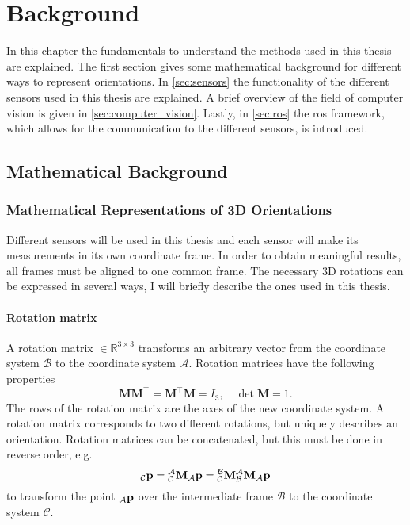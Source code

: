 \chapter{Background}
\label{ch:Background}
In this chapter the fundamentals to understand the methods used in this thesis are explained.
The first section gives some mathematical background for different ways to represent orientations.
In \cref{sec:sensors} the functionality of the different sensors used in this thesis are explained.
A brief overview of the field of computer vision is given in \cref{sec:computer_vision}.
Lastly, in \cref{sec:ros} the \gls{ros} framework, which allows for the communication to the different sensors, is introduced.


\section{Mathematical Background}
\subsection{Mathematical Representations of 3D Orientations}
Different sensors will be used in this thesis and each sensor will make its measurements in its own coordinate frame.
In order to obtain meaningful results, all frames must be aligned to one common frame.
The necessary 3D rotations can be expressed in several ways, I will briefly describe the ones used in this thesis.

\subsubsection{Rotation matrix}
A rotation matrix  $\in \mathbb{R}^{3\times3}$ transforms an arbitrary vector from the coordinate system $\mathcal{B}$ to the coordinate system $\mathcal{A}$.
Rotation matrices have the following properties
\begin{equation}
	\mathbf{M}\mathbf{M}^\intercal = \mathbf{M}^\intercal \mathbf{M} = I_3, \quad \det \mathbf{M} = 1.
\end{equation}
The rows of the rotation matrix are the axes of the new coordinate system.
A rotation matrix corresponds to two different rotations, but uniquely describes an orientation.
Rotation matrices can be concatenated, but this must be done in reverse order, e.g.
\begin{equation}
	{}_\mathcal{C}\vb{p} = \mtf{a}{c}{}_\mathcal{A}\vb{p} = \mtf{b}{c}\mtf{a}{b}{}_\mathcal{A}\vb{p}
\end{equation}
to transform the point ${}_\mathcal{A}\vb{p}$ over the intermediate frame $\mathcal{B}$ to the coordinate system $\mathcal{C}$.


